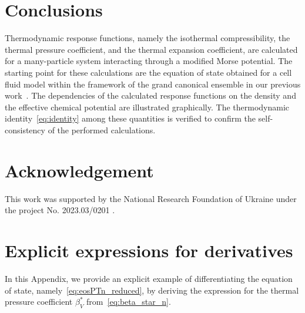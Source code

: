 
\section{Conclusions}
Thermodynamic response functions, namely the isothermal compressibility, the thermal pressure coefficient, and the thermal expansion coefficient, are calculated for a many-particle system interacting through a modified Morse potential. The starting point for these calculations are the equation of state obtained for a cell fluid model within the framework of the grand canonical ensemble in our previous work~\cite{KozlovskiiDobush2020}. The dependencies of the calculated response functions on the density and the effective chemical potential are illustrated graphically. The thermodynamic identity~\eqref{eq:identity} among these quantities is verified to confirm the self-consistency of the performed calculations.

\section{Acknowledgement}

This work was supported by the National Research Foundation of Ukraine under the project No. 2023.03/0201 .

\appendix
\renewcommand{\theequation}{A.\arabic{equation}}
\setcounter{equation}{0}

\section{\label{sec:app-a} Explicit expressions for derivatives}
In this Appendix, we provide an explicit example of differentiating the equation of state, namely~\eqref{eq:eosPTn_reduced}, by deriving the expression for the thermal pressure coefficient $\beta^*_V$ from~\eqref{eq:beta_star_n}.

